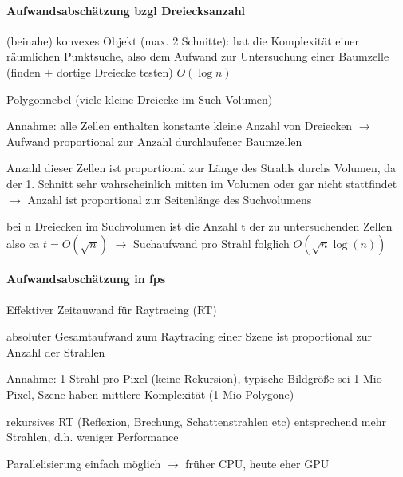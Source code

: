 \documentclass[landscape]{article}
\begin{document}
\begin{multicols}{3}
  \paragraph{Aufwandsabschätzung bzgl Dreiecksanzahl}
  \begin{enumerate*}
    \item (beinahe) konvexes Objekt (max. 2 Schnitte): hat die Komplexität einer räumlichen Punktsuche, also dem Aufwand zur Untersuchung einer Baumzelle (finden + dortige Dreiecke testen) $O(\log n)$
    \item Polygonnebel (viele kleine Dreiecke im Such-Volumen)
    \begin{itemize*}
      \item Annahme: alle Zellen enthalten konstante kleine Anzahl von Dreiecken $\rightarrow$ Aufwand proportional zur Anzahl durchlaufener Baumzellen
      \item Anzahl dieser Zellen ist proportional zur Länge des Strahls durchs Volumen, da der 1. Schnitt sehr wahrscheinlich mitten im Volumen oder gar nicht stattfindet $\rightarrow$ Anzahl ist proportional zur Seitenlänge des Suchvolumens
      \item bei n Dreiecken im Suchvolumen ist die Anzahl t der zu untersuchenden Zellen also ca $t=O(\sqrt{n})$ $\rightarrow$ Suchaufwand pro Strahl folglich $O(\sqrt{n} \log (n))$
    \end{itemize*}
  \end{enumerate*}
  
  \paragraph{Aufwandsabschätzung in fps}
  \begin{itemize*}
    \item Effektiver Zeitauwand für Raytracing (RT)
    \item absoluter Gesamtaufwand zum Raytracing einer Szene ist proportional zur Anzahl der Strahlen
    \item Annahme: 1 Strahl pro Pixel (keine Rekursion), typische Bildgröße sei 1 Mio Pixel, Szene haben mittlere Komplexität (1 Mio Polygone)
    \item rekursives RT (Reflexion, Brechung, Schattenstrahlen etc) entsprechend mehr Strahlen, d.h. weniger Performance
    \item Parallelisierung einfach möglich $\rightarrow$ früher CPU, heute eher GPU
  \end{itemize*}
  

\end{multicols}
\end{document}
